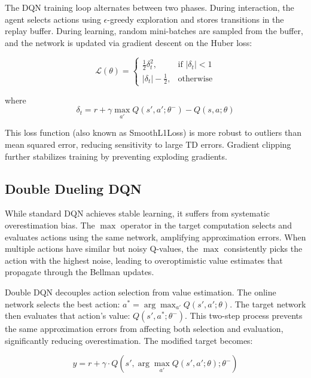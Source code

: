 The DQN training loop alternates between two phases. During interaction, the agent selects actions using $\epsilon$-greedy exploration and stores transitions in the replay buffer. During learning, random mini-batches are sampled from the buffer, and the network is updated via gradient descent on the Huber loss:

\begin{equation}
\mathcal{L}(\theta) = 
\begin{cases}
\frac{1}{2} \delta_t^2, & \text{if } |\delta_t| < 1 \\
|\delta_t| - \frac{1}{2}, & \text{otherwise}
\end{cases}
\end{equation}

\noindent where
\begin{equation}
\delta_t = r + \gamma \max_{a'} Q(s', a'; \theta^{-}) - Q(s, a; \theta)
\end{equation}

This loss function (also known as SmoothL1Loss) is more robust to outliers than mean squared error, reducing sensitivity to large TD errors. Gradient clipping further stabilizes training by preventing exploding gradients.
\subsection{Double Dueling DQN}

While standard DQN achieves stable learning, it suffers from systematic overestimation bias. The $\max$ operator in the target computation selects and evaluates actions using the same network, amplifying approximation errors. When multiple actions have similar but noisy Q-values, the $\max$ consistently picks the action with the highest noise, leading to overoptimistic value estimates that propagate through the Bellman updates.

Double DQN decouples action selection from value estimation. The online network selects the best action: $a^* = \arg\max_{a'} Q(s', a'; \theta)$. The target network then evaluates that action's value: $Q(s', a^*; \theta^-)$. This two-step process prevents the same approximation errors from affecting both selection and evaluation, significantly reducing overestimation. The modified target becomes:

\begin{equation}
y = r + \gamma \cdot Q(s', \arg\max_{a'} Q(s',a';\theta); \theta^-)
\end{equation}

